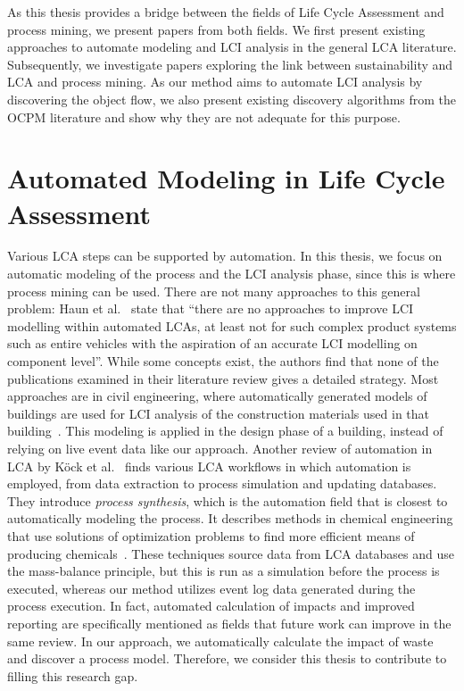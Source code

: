 As this thesis provides a bridge between the fields of Life Cycle Assessment and process mining, we present papers from both fields.
We first present existing approaches to automate modeling and LCI analysis in the general LCA literature.
Subsequently, we investigate papers exploring the link between sustainability and LCA and process mining.
As our method aims to automate LCI analysis by discovering the object flow, we also present existing discovery algorithms from the OCPM literature and show why they are not adequate for this purpose.


\section{Automated Modeling in Life Cycle Assessment}



Various LCA steps can be supported by automation.
In this thesis, we focus on automatic modeling of the process and the LCI analysis phase, since this is where process mining can be used.
There are not many approaches to this general problem: Haun et al.~\autocite{haun2022} state that \enquote{there are no approaches to improve LCI modelling within automated LCAs, at least not for such complex product systems such as entire vehicles with the aspiration of an accurate LCI modelling on component level}.
While some concepts exist, the authors find that none of the publications examined in their literature review gives a detailed strategy.
Most approaches are in civil engineering, where automatically generated models of buildings are used for LCI analysis of the construction materials used in that building~\autocite{schneider2023}.
This modeling is applied in the design phase of a building, instead of relying on live event data like our approach.
Another review of automation in LCA by Köck et al.~\autocite{kock2023} finds various LCA workflows in which automation is employed, from data extraction to process simulation and updating databases.
They introduce \emph{process synthesis}, which is the automation field that is closest to automatically modeling the process.
It describes methods in chemical engineering that use solutions of optimization problems to find more efficient means of producing chemicals~\autocite{kleinekorte2020}.
These techniques source data from LCA databases and use the mass-balance principle, but this is run as a simulation before the process is executed, whereas our method utilizes event log data generated during the process execution.
In fact, automated calculation of impacts and improved reporting are specifically mentioned as fields that future work can improve in the same review.
In our approach, we automatically calculate the impact of waste and discover a process model.
Therefore, we consider this thesis to contribute to filling this research gap.




